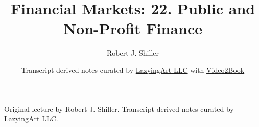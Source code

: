\documentclass[11pt,oneside]{book}
\begin{document}
\frontmatter
\title{Financial Markets: 22. Public and Non-Profit Finance}
\author{Robert J. Shiller}
\date{Transcript-derived notes curated by \href{https://lazying.art}{LazyingArt LLC} with \href{https://github.com/lachlanchen/Video2Book}{Video2Book}}
\maketitle
\begin{center}
\small Original lecture by Robert J. Shiller. Transcript-derived notes curated by \href{https://lazying.art}{LazyingArt LLC}.
\end{center}
\clearpage
\mainmatter

\end{document}
